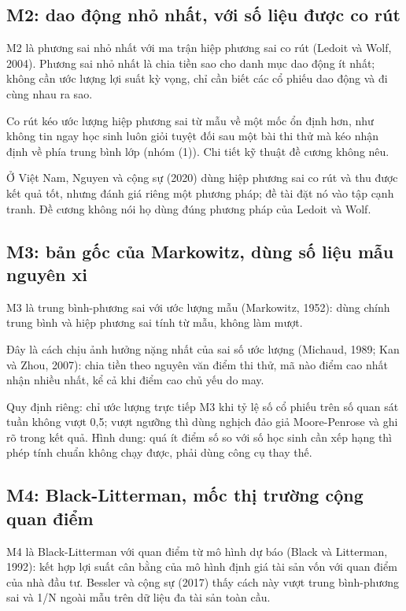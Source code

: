 \subsection{M2: dao động nhỏ nhất, với số liệu được co rút}

M2 là phương sai nhỏ nhất với ma trận hiệp phương sai co rút (Ledoit và Wolf, 2004). Phương sai nhỏ nhất là chia tiền sao cho danh mục dao động ít nhất; không cần ước lượng lợi suất kỳ vọng, chỉ cần biết các cổ phiếu dao động và đi cùng nhau ra sao.

Co rút kéo ước lượng hiệp phương sai từ mẫu về một mốc ổn định hơn, như không tin ngay học sinh luôn giỏi tuyệt đối sau một bài thi thử mà kéo nhận định về phía trung bình lớp (nhóm (1)). Chi tiết kỹ thuật đề cương không nêu.

Ở Việt Nam, Nguyen và cộng sự (2020) dùng hiệp phương sai co rút và thu được kết quả tốt, nhưng đánh giá riêng một phương pháp; đề tài đặt nó vào tập cạnh tranh. Đề cương không nói họ dùng đúng phương pháp của Ledoit và Wolf.

\subsection{M3: bản gốc của Markowitz, dùng số liệu mẫu nguyên xi}

M3 là trung bình-phương sai với ước lượng mẫu (Markowitz, 1952): dùng chính trung bình và hiệp phương sai tính từ mẫu, không làm mượt.

Đây là cách chịu ảnh hưởng nặng nhất của sai số ước lượng (Michaud, 1989; Kan và Zhou, 2007): chia tiền theo nguyên văn điểm thi thử, mã nào điểm cao nhất nhận nhiều nhất, kể cả khi điểm cao chủ yếu do may.

Quy định riêng: chỉ ước lượng trực tiếp M3 khi tỷ lệ số cổ phiếu trên số quan sát tuần không vượt 0,5; vượt ngưỡng thì dùng nghịch đảo giả Moore-Penrose và ghi rõ trong kết quả. Hình dung: quá ít điểm số so với số học sinh cần xếp hạng thì phép tính chuẩn không chạy được, phải dùng công cụ thay thế.

\subsection{M4: Black-Litterman, mốc thị trường cộng quan điểm}

M4 là Black-Litterman với quan điểm từ mô hình dự báo (Black và Litterman, 1992): kết hợp lợi suất cân bằng của mô hình định giá tài sản vốn với quan điểm của nhà đầu tư. Bessler và cộng sự (2017) thấy cách này vượt trung bình-phương sai và 1/N ngoài mẫu trên dữ liệu đa tài sản toàn cầu.

